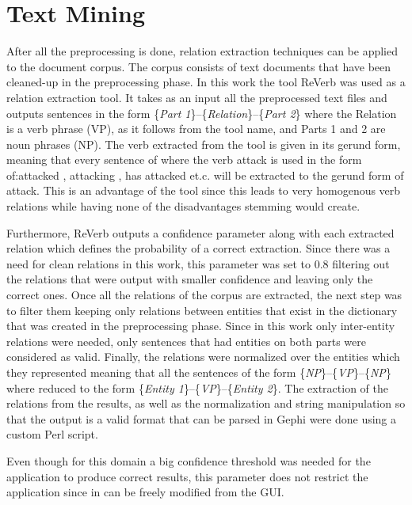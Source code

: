 \documentclass[]{article}
\begin{document}
\section{Text Mining}
%
After all the preprocessing is done, relation extraction techniques can be applied to the document corpus. The corpus consists of text documents that have been cleaned-up in the preprocessing phase. In this work the tool ReVerb was used as a relation extraction tool. It takes as an input all the preprocessed text files and outputs sentences in the form \{\textit{Part 1}\}--\{\textit{Relation}\}--\{\textit{Part 2}\} where the Relation is a verb phrase (VP), as it follows from the tool name, and Parts 1 and 2 are noun phrases (NP).  The verb extracted from the tool is given in its gerund form, meaning that every sentence of where the verb attack is used in the form of:attacked , attacking , has attacked et.c. will be extracted to the gerund form of attack. This is an advantage of the tool since this leads to very homogenous verb relations while having none of the disadvantages stemming would create. 

Furthermore, ReVerb outputs a confidence parameter along with each extracted relation which defines the probability of a correct extraction. Since there was a need for clean relations in this work, this parameter was set to 0.8 filtering out the relations that were output with smaller confidence and leaving only the correct ones. Once all the relations of the corpus are extracted, the next step was to filter them keeping only relations between entities that exist in the dictionary that was created in the preprocessing phase. Since in this work only inter-entity relations were needed, only sentences that had entities on both parts were considered as valid. Finally, the relations were normalized over the entities which they represented meaning that all the sentences of the form \{\textit{NP}\}--\{\textit{VP}\}--\{\textit{NP}\} where reduced to the form \{\textit{Entity 1}\}--\{\textit{VP}\}--\{\textit{Entity 2}\}. The extraction of the relations from the results, as well as the normalization and string manipulation so that the output is a valid format that can be parsed in Gephi were done using a custom Perl script.

Even though for this domain a big confidence threshold was needed for the application to produce correct results, this parameter does not restrict the application since in can be freely modified from the GUI.

%
\end{document}
